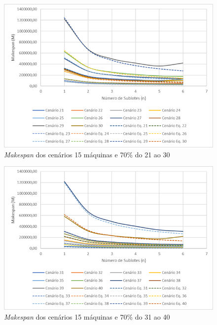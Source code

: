 \begin{figure}[H]
    \centering
     \includegraphics[width=13cm]{Apendices/Figuras/15m70_21-30.png}
     \caption{\textit{Makespan} dos cenários 15 máquinas e 70\% do 21 ao 30}
    \label{fig:15m70_21-30}
\end{figure}

\begin{figure}[H]
    \centering
     \includegraphics[width=13cm]{Apendices/Figuras/15m70_31-40.png}
     \caption{\textit{Makespan} dos cenários 15 máquinas e 70\% do 31 ao 40}
    \label{fig:15m70_31-40}
\end{figure}

